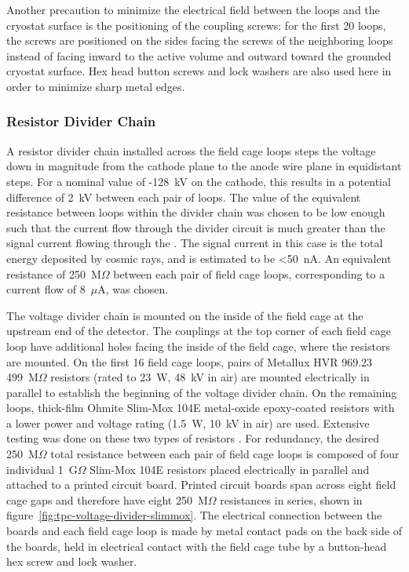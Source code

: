Another precaution to minimize the electrical field between the loops and the cryostat surface is the positioning of the coupling screws: for the first 20 loops, the screws are positioned on the sides facing the screws of the neighboring loops instead of facing inward to the \lartpc active volume and outward toward the grounded cryostat surface. Hex head button screws and lock washers are also used here in order to minimize sharp metal edges.


\subsubsection{Resistor Divider Chain}

A resistor divider chain installed across the field cage loops steps the voltage down in magnitude from the cathode plane to the anode wire plane in equidistant steps.  For a nominal value of -128~kV on the cathode, this results in a potential difference of 2~kV between each pair of loops. The value of the equivalent resistance between loops within the divider chain was chosen to be low enough such that the current flow through the divider circuit is much greater than the signal current flowing through the \lartpc. The signal current in this case is the total energy deposited by cosmic rays, and is estimated to be <50~nA. An equivalent resistance of 250~M$\Omega$ between each pair of field cage loops, corresponding to a current flow of 8~$\mu$A, was chosen.  

The voltage divider chain is mounted on the inside of the field cage at the upstream end of the detector. The couplings at the top corner of each field cage loop have additional holes facing the inside of the field cage, where the resistors are mounted. On the first 16 field cage loops, pairs of Metallux HVR 969.23 499~M$\Omega$ resistors (rated to 23~W, 48~kV in air) are mounted electrically in parallel to establish the beginning of the voltage divider chain. On the remaining loops, thick-film Ohmite Slim-Mox 104E metal-oxide epoxy-coated resistors with a lower power and voltage rating (1.5~W, 10~kV in air) are used. Extensive testing was done on these two types of resistors \cite{Bagby:2014wva}. For redundancy, the desired 250~M$\Omega$ total resistance between each pair of field cage loops is composed of four individual 1~G$\Omega$ Slim-Mox 104E resistors placed electrically in parallel and attached to a printed circuit board. Printed circuit boards span across eight field cage gaps and therefore have eight 250~M$\Omega$ resistances in series, shown in figure~\ref{fig:tpc-voltage-divider-slimmox}. The electrical connection between the boards and each field cage loop is made by metal contact pads on the back side of the boards, held in electrical contact with the field cage tube by a button-head hex screw and lock washer.

